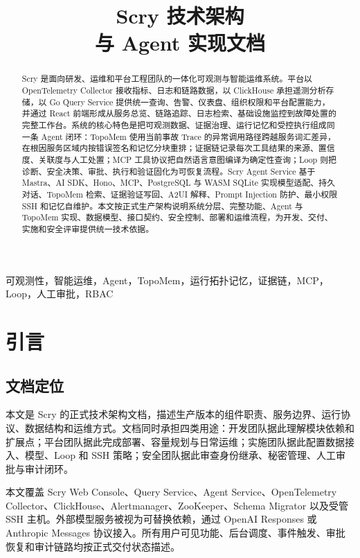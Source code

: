 \documentclass[conference,10pt]{IEEEtran}
\title{Scry 技术架构\\与 Agent 实现文档}
\author{\IEEEauthorblockN{Scry 技术团队}
\IEEEauthorblockA{文档版本：1.0.0\quad 适用架构：Scry Production Architecture\\
适用范围：平台服务、智能运维 Agent、Loop 自动化与安全控制}}
\begin{document}
\maketitle

\begin{abstract}
Scry 是面向研发、运维和平台工程团队的一体化可观测与智能运维系统。平台以 OpenTelemetry Collector 接收指标、日志和链路数据，以 ClickHouse 承担遥测分析存储，以 Go Query Service 提供统一查询、告警、仪表盘、组织权限和平台配置能力，并通过 React 前端形成从服务总览、链路追踪、日志检索、基础设施监控到故障处置的完整工作台。系统的核心特色是把可观测数据、证据治理、运行记忆和受控执行组成同一条 Agent 闭环：TopoMem 使用当前事故 Trace 的异常调用路径跨越服务词汇差异，在根因服务区域内按错误签名和记忆分块重排；证据链记录每次工具结果的来源、置信度、关联度与人工处置；MCP 工具协议把自然语言意图编译为确定性查询；Loop 则把诊断、安全决策、审批、执行和验证固化为可恢复流程。Scry Agent Service 基于 Mastra、AI SDK、Hono、MCP、PostgreSQL 与 WASM SQLite 实现模型适配、持久对话、TopoMem 检索、证据验证写回、A2UI 解释、Prompt Injection 防护、最小权限 SSH 和记忆自维护。本文按正式生产架构说明系统分层、完整功能、Agent 与 TopoMem 实现、数据模型、接口契约、安全控制、部署和运维流程，为开发、交付、实施和安全评审提供统一技术依据。
\end{abstract}

\begin{IEEEkeywords}
可观测性，智能运维，Agent，TopoMem，运行拓扑记忆，证据链，MCP，Loop，人工审批，RBAC
\end{IEEEkeywords}

\section{引言}

\subsection{文档定位}

本文是 Scry 的正式技术架构文档，描述生产版本的组件职责、服务边界、运行协议、数据结构和运维方式。文档同时承担四类用途：开发团队据此理解模块依赖和扩展点；平台团队据此完成部署、容量规划与日常运维；实施团队据此配置数据接入、模型、Loop 和 SSH 策略；安全团队据此审查身份继承、秘密管理、人工审批与审计闭环。

本文覆盖 Scry Web Console、Query Service、Agent Service、OpenTelemetry Collector、ClickHouse、Alertmanager、ZooKeeper、Schema Migrator 以及受管 SSH 主机。外部模型服务被视为可替换依赖，通过 OpenAI Responses 或 Anthropic Messages 协议接入。所有用户可见功能、后台调度、事件触发、审批恢复和审计链路均按正式交付状态描述。
\end{document}
